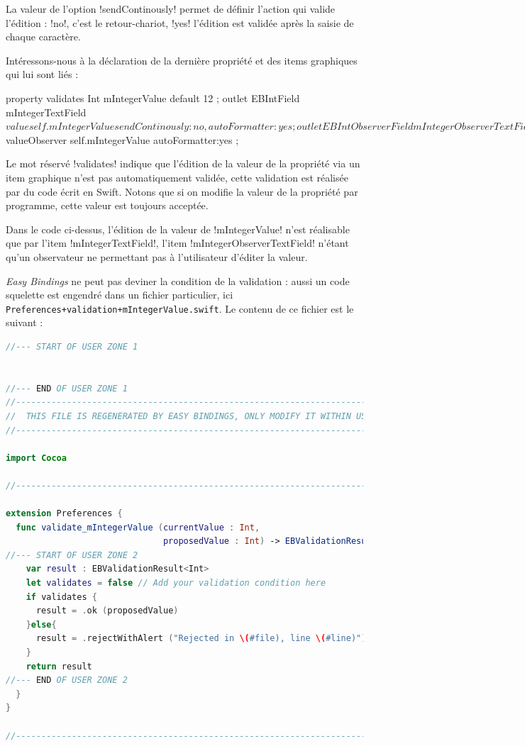 La valeur de l'option \eb!sendContinously! permet de définir l'action qui valide l'édition : \eb!no!, c'est le retour-chariot, \eb!yes! l'édition est validée après la saisie de chaque caractère.




Intéressons-nous à la déclaration de la dernière propriété et des items graphiques qui lui sont liés :

\begin{ebcode}
property validates Int mIntegerValue default 12 ;
outlet EBIntField mIntegerTextField
  $value self.mIntegerValue {sendContinously : no, autoFormatter:yes}
;
outlet EBIntObserverField mIntegerObserverTextField
  $valueObserver self.mIntegerValue {autoFormatter:yes}
;
\end{ebcode}

Le mot réservé \eb!validates! indique que l'édition de la valeur de la propriété via un item graphique n'est pas automatiquement validée, cette validation est réalisée par du code écrit en Swift. Notons que si on modifie la valeur de la propriété par programme, cette valeur est toujours acceptée.

Dans le code ci-dessus, l'édition de la valeur de \eb!mIntegerValue! n'est réalisable que par l'item \eb!mIntegerTextField!, l'item \eb!mIntegerObserverTextField! n'étant qu'un observateur ne permettant pas à l'utilisateur d'éditer la valeur.

\emph{Easy Bindings} ne peut pas deviner la condition de la validation : aussi un code squelette est engendré dans un fichier particulier, ici \texttt{Preferences+validation+mIntegerValue.swift}. Le contenu de ce fichier est le suivant :

\begin{lstlisting}[language=swift]
//--- START OF USER ZONE 1


//--- END OF USER ZONE 1
//------------------------------------------------------------------------------
//  THIS FILE IS REGENERATED BY EASY BINDINGS, ONLY MODIFY IT WITHIN USER ZONES
//------------------------------------------------------------------------------

import Cocoa

//------------------------------------------------------------------------------*

extension Preferences {
  func validate_mIntegerValue (currentValue : Int,
                               proposedValue : Int) -> EBValidationResult <Int> {
//--- START OF USER ZONE 2
    var result : EBValidationResult<Int>
    let validates = false // Add your validation condition here
    if validates {
      result = .ok (proposedValue)
    }else{
      result = .rejectWithAlert ("Rejected in \(#file), line \(#line)")
    }
    return result
//--- END OF USER ZONE 2
  }
}

//--------------------------------------------------------------------------------*
\end{lstlisting}

